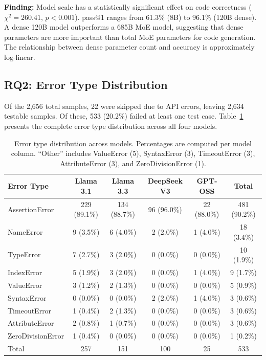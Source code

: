 \documentclass[smallextended]{svjour3}
\begin{document}
\begin{tcolorbox}[colback=gray!5, colframe=gray!40, title=Summary for RQ1]
\textbf{Finding:} Model scale has a statistically significant effect on code correctness ($\chi^2 = 260.41$, $p < 0.001$). pass@1 ranges from 61.3\% (8B) to 96.1\% (120B dense). A dense 120B model outperforms a 685B MoE model, suggesting that dense parameters are more important than total MoE parameters for code generation. The relationship between dense parameter count and accuracy is approximately log-linear.
\end{tcolorbox}

\subsection{RQ2: Error Type Distribution}
\label{sec:rq2}

Of the 2,656 total samples, 22 were skipped due to API errors, leaving 2,634 testable samples. Of these, 533 (20.2\%) failed at least one test case. Table~\ref{tab:error_dist} presents the complete error type distribution across all four models.

\begin{table}[t]
\centering
\caption{Error type distribution across models. Percentages are computed per model column. ``Other'' includes ValueError (5), SyntaxError (3), TimeoutError (3), AttributeError (3), and ZeroDivisionError (1).}
\label{tab:error_dist}
\begin{tabular}{lccccc}
\toprule
Error Type & Llama 3.1 & Llama 3.3 & DeepSeek V3 & GPT-OSS & Total \\
\midrule
AssertionError & 229 (89.1\%) & 134 (88.7\%) & 96 (96.0\%) & 22 (88.0\%) & 481 (90.2\%) \\
NameError & 9 (3.5\%) & 6 (4.0\%) & 2 (2.0\%) & 1 (4.0\%) & 18 (3.4\%) \\
TypeError & 7 (2.7\%) & 3 (2.0\%) & 0 (0.0\%) & 0 (0.0\%) & 10 (1.9\%) \\
IndexError & 5 (1.9\%) & 3 (2.0\%) & 0 (0.0\%) & 1 (4.0\%) & 9 (1.7\%) \\
ValueError & 3 (1.2\%) & 2 (1.3\%) & 0 (0.0\%) & 0 (0.0\%) & 5 (0.9\%) \\
SyntaxError & 0 (0.0\%) & 0 (0.0\%) & 2 (2.0\%) & 1 (4.0\%) & 3 (0.6\%) \\
TimeoutError & 1 (0.4\%) & 2 (1.3\%) & 0 (0.0\%) & 0 (0.0\%) & 3 (0.6\%) \\
AttributeError & 2 (0.8\%) & 1 (0.7\%) & 0 (0.0\%) & 0 (0.0\%) & 3 (0.6\%) \\
ZeroDivisionError & 1 (0.4\%) & 0 (0.0\%) & 0 (0.0\%) & 0 (0.0\%) & 1 (0.2\%) \\
\midrule
Total & 257 & 151 & 100 & 25 & 533 \\
\bottomrule
\end{tabular}
\end{table}
\end{document}
